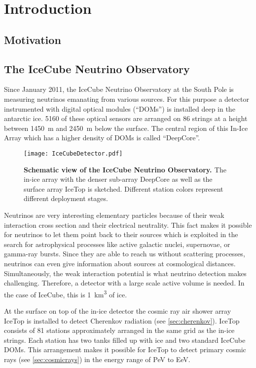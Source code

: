 \chapter{Introduction}

\section{Motivation}

\section{The IceCube Neutrino Observatory}

Since January 2011, the IceCube Neutrino Observatory at the South Pole is measuring neutrinos emanating from various sources. For this purpose a detector instrumented with digital optical modules (\enquote{DOMs}) is installed deep in the antarctic ice. 5160 of these optical sensors are arranged on 86 strings at a height between \SI{1450}{\meter} and \SI{2450}{\meter} below the surface. The central region of this In-Ice Array which has a higher density of DOMs is called \enquote{DeepCore}.

\begin{figure}[h]
	\texttt{[image: IceCubeDetector.pdf]}
	\caption[Schematic view of IceCube]{\textbf{Schematic view of the IceCube Neutrino Observatory. \cite{icecube:instrumentation}} The in-ice array with the denser sub-array DeepCore as well as the surface array IceTop is sketched. Different station colors represent different deployment stages.}
\end{figure}

Neutrinos are very interesting elementary particles because of their weak interaction cross section and their electrical neutrality. This fact makes it possible for neutrinos to let them point back to their sources which is exploited in the search for astrophysical processes like active galactic nuclei, supernovae, or gamma-ray bursts. Since they are able to reach us without scattering processes, neutrinos can even give information about sources at cosmological distances. Simultaneously, the weak interaction potential is what neutrino detection makes challenging. Therefore, a detector with a large scale active volume is needed. In the case of IceCube, this is \SI{1}{\cubic\kilo\meter} of ice.

At the surface on top of the in-ice detector the cosmic ray air shower array IceTop is installed to detect Cherenkov radiation (see \ref{sec:cherenkov}). IceTop consists of 81 stations approximately arranged in the same grid as the in-ice strings. Each station has two tanks filled up with ice and two standard IceCube DOMs. This arrangement makes it possible for IceTop to detect primary cosmic rays (see \ref{sec:cosmicrays}) in the energy range of \si{\peta\electronvolt} to \si{\exa\electronvolt}. \cite{icecube:instrumentation}


